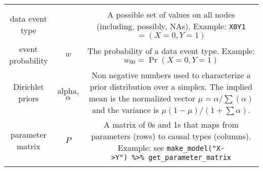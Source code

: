 \documentclass[
  12pt,
]{book}
\begin{document}
\begin{longtable}[]{@{}ccc@{}}
\begin{minipage}[t]{0.57\columnwidth}
\end{minipage}\tabularnewline
\begin{minipage}[t]{0.20\columnwidth}\centering
data event type\strut
\end{minipage} & \begin{minipage}[t]{0.15\columnwidth}\centering
\strut
\end{minipage} & \begin{minipage}[t]{0.57\columnwidth}\centering
A possible set of values on all nodes (including, possibly, NAs). Example: \texttt{X0Y1} \(= (X=0, Y = 1)\)\strut
\end{minipage}\tabularnewline
\begin{minipage}[t]{0.20\columnwidth}\centering
event probability\strut
\end{minipage} & \begin{minipage}[t]{0.15\columnwidth}\centering
\(w\)\strut
\end{minipage} & \begin{minipage}[t]{0.57\columnwidth}\centering
The probability of a data event type. Example: \(w_{00}=\Pr(X=0, Y=1)\)\strut
\end{minipage}\tabularnewline
\begin{minipage}[t]{0.20\columnwidth}\centering
Dirichlet priors\strut
\end{minipage} & \begin{minipage}[t]{0.15\columnwidth}\centering
alpha, \(\alpha\)\strut
\end{minipage} & \begin{minipage}[t]{0.57\columnwidth}\centering
Non negative numbers used to characterize a prior distribution over a simplex. The implied mean is the normalized vector \(\mu= \alpha/\sum(\alpha)\) and the variance is \(\mu(1-\mu)/(1+\sum\alpha)\).\strut
\end{minipage}\tabularnewline
\begin{minipage}[t]{0.20\columnwidth}\centering
parameter matrix\strut
\end{minipage} & \begin{minipage}[t]{0.15\columnwidth}\centering
\(P\)\strut
\end{minipage} & \begin{minipage}[t]{0.57\columnwidth}\centering
A matrix of 0s and 1s that maps from parameters (rows) to causal types (columns). Example: see \texttt{make\_model("X-\textgreater{}Y")\ \%\textgreater{}\%\ get\_parameter\_matrix}\strut
\end{minipage}\tabularnewline
\begin{minipage}[t]{0.20\columnwidth}\centering

\end{minipage}
\end{longtable}
\end{document}
